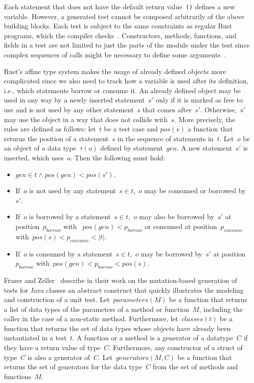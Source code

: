 \documentclass[paper=a4,%
  twoside,%
  BCOR4mm,%
  abstract=true,%
  toc=bibliography,%
  chapterprefix=true,%
  toc=bibliographynumbered,%
  open=right,%
  english,%
  pagesize=pdftex]{scrreprt}
\begin{document}
Each statement that does not have the default return value~\texttt{()} defines a new variable. However, a generated test cannot be composed arbitrarily of the above building blocks. Each test is subject to the same constraints as regular Rust programs, which the compiler checks~\cite{Tonella2004}. Constructors, methods, functions, and fields in a test are not limited to just the parts of the module under the test since complex sequences of calls might be necessary to define some arguments~\cite{Fraser2012}.

Rust's affine type system makes the usage of already defined objects more complicated since we also need to track how a variable is used after its definition, i.e., which statements borrow or consume it. An already defined object may be used in any way by a newly inserted statement~$s'$ only if it is marked as free to use and is not used by any other statement~$s$ that comes after~$s'$. Otherwise,~$s'$ may use the object in a way that does not collide with~$s$. More precisely, the rules are defined as follows: let~$t$ be a test case and $pos(s)$ a function that returns the position of a statement~$s$ in the sequence of statements in~$t$. Let~$o$ be an object of a data type~$\tau(o)$ defined by statement~$gen$. A new statement~$s'$ is inserted, which uses~$o$. Then the following must hold:
\begin{itemize}
    \item $gen \in t \wedge pos(gen) < pos(s')$.
    \item If~$o$ is not used by any statement~$s \in t$,~$o$ may be consumed or borrowed by~$s'$.
    \item If~$o$ is borrowed by a statement~$s \in t$,~$o$ may also be borrowed by~$s'$ at position~$p_{borrow}$ with ~$pos(gen) < p_{borrow}$ or consumed at position~$p_{consume}$ with~$pos(s) < p_{consume} < \left|t\right|$.
    \item If~$o$ is consumed by a statement~$s \in t$,~$o$ may be borrowed by~$s'$ at position~$p_{borrow}$ with~$pos(gen) < p_{borrow} < pos(s)$.
\end{itemize}

Fraser and Zeller~\cite{Fraser2012} describe in their work on the mutation-based generation of tests for Java classes an abstract construct that quickly illustrates the modeling and construction of a unit test. Let~$parameters(M)$ be a function that returns a list of data types of the parameters of a method or function~$M$, including the caller in the case of a non-static method. Furthermore, let~$classes(t)$ be a function that returns the set of data types whose objects have already been instantiated in a test~$t$. A function or a method is a generator of a datatype~$C$ if they have a return value of type~$C$. Furthermore, any constructor of a struct of type~$C$ is also a generator of~$C$. Let~$generators(M,C)$ be a function that returns the set of generators for the data type~$C$ from the set of methods and functions~$M$.
\end{document}
